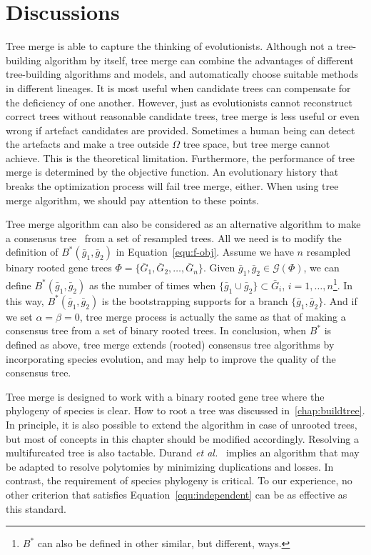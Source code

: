 \section{Discussions}
Tree merge is able to capture the thinking of evolutionists. Although not
a tree-building algorithm by itself, tree merge can combine the advantages of
different tree-building algorithms and models, and automatically choose suitable
methods in different lineages. It is most useful when candidate trees
can compensate for the deficiency of one another. However,
just as evolutionists cannot reconstruct correct trees
without reasonable candidate trees, tree merge is less useful or even wrong
if artefact candidates are provided. Sometimes a human being can detect the artefacts
and make a tree outside $\Omega$ tree space, but tree merge cannot achieve.
This is the theoretical limitation. Furthermore, the performance of tree merge is
determined by the objective function. An evolutionary history that breaks
the optimization process will fail tree merge, either.
When using tree merge algorithm, we should pay attention to these points.

Tree merge algorithm can also be considered as an alternative algorithm to make
a consensus tree~\cite{margush81} from a set of resampled trees. All we need is to modify the definition of $B^*(\bar{g}_1,\bar{g}_2)$
in Equation~\ref{equ:f-obj}. Assume we have $n$ resampled binary rooted gene trees $\Phi=\{\bar{G}_1,\bar{G}_2,\ldots,\bar{G}_n\}$.
Given $\bar{g}_1,\bar{g}_2\in\mathcal{G}(\Phi)$, we can define $B^*(\bar{g}_1,\bar{g}_2)$ as the number of times when
$\{\bar{g}_1\cup\bar{g}_2\}\subset\bar{G}_i$, $i=1,\ldots,n$\footnote{$B^*$
can also be defined in other similar, but different, ways.}. In this way,
$B^*(\bar{g}_1,\bar{g}_2)$ is the bootstrapping supports for a branch $\{\bar{g}_1,\bar{g}_2\}$.
And if we set $\alpha=\beta=0$, tree merge process is actually the same as that of making a consensus tree from a set of
binary rooted trees. In conclusion, when $B^*$ is defined as above, tree merge extends (rooted) consensus
tree algorithms by incorporating species evolution, and may help to improve the quality of the consensus tree.

Tree merge is designed to work with a binary rooted gene tree where the phylogeny
of species is clear. How to root a tree was discussed in~\ref{chap:buildtree}.
In principle, it is also possible to extend the algorithm in case of unrooted trees,
but most of concepts in this chapter should be modified accordingly.
Resolving a multifurcated tree is also tactable. Durand {\it et al.}~\cite{durand06} implies
an algorithm that may be adapted to resolve polytomies by minimizing duplications and losses.
In contrast, the requirement of species phylogeny is critical. To our experience, no other criterion that
satisfies Equation~\ref{equ:independent} can be as effective as this standard.
